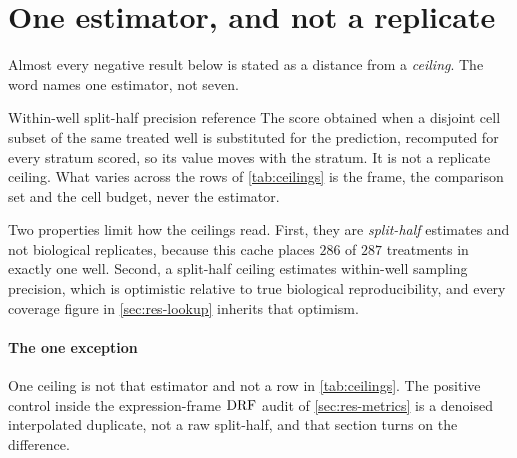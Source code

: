 \section{One estimator, and not a replicate}

Almost every negative result below is stated as a distance from a
\emph{ceiling}. The word names one estimator, not seven.

\begin{defn}{Within-well split-half precision reference}
The score obtained when a disjoint cell subset of the same treated well is
substituted for the prediction, recomputed for every stratum scored, so its
value moves with the stratum. It is not a replicate ceiling. What varies across
the rows of \cref{tab:ceilings} is the frame, the comparison set and the cell
budget, never the estimator.
\end{defn}

Two properties limit how the ceilings read. First, they are \emph{split-half}
estimates and not biological replicates, because this cache places $286$ of
$287$ treatments in exactly one well. Second, a split-half ceiling estimates
within-well sampling precision, which is optimistic relative to true biological
reproducibility, and every coverage figure in \cref{sec:res-lookup} inherits
that optimism.

\paragraph{The one exception} One ceiling is not that estimator and not a row in
\cref{tab:ceilings}. The positive control inside the expression-frame $\textrm{DRF}$
audit of \cref{sec:res-metrics} is a denoised interpolated duplicate, not a raw
split-half, and that section turns on the difference.

